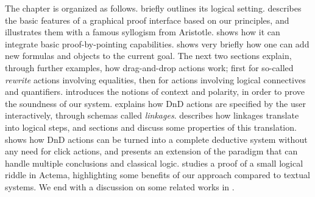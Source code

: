 The chapter is organized as follows.  briefly outlines its
logical setting.  describes the basic features of a graphical
proof interface based on our principles, and illustrates them with a famous
syllogism from Aristotle.  shows how it can integrate basic
proof-by-pointing capabilities.  shows very briefly how one can
add new formulas and objects to the current goal. The next two sections explain,
through further examples, how drag-and-drop actions work; first for so-called
\emph{rewrite} actions involving equalities, then for actions involving logical
connectives and quantifiers.  introduces the notions of
context and polarity, in order to prove the soundness of our system.
 explains how DnD actions are specified by the user
interactively, through schemas called \emph{linkages}.  describes
how linkages translate into logical steps, and sections 
and  discuss some properties of this translation.
 shows how DnD actions can be turned into a complete
deductive system without any need for click actions, and 
presents an extension of the paradigm that can handle multiple conclusions and
classical logic.  studies a proof of a small logical riddle in
Actema, highlighting some benefits of our approach compared to textual systems.
We end with a discussion on some related works in .




